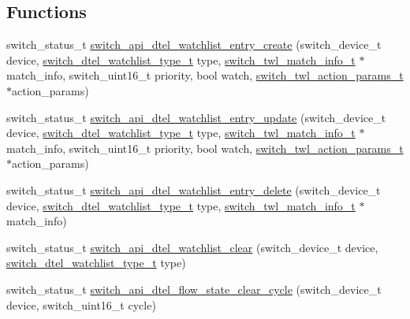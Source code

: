 \subsection*{Functions}
\begin{DoxyCompactItemize}
\item 
switch\+\_\+status\+\_\+t \hyperlink{group__DTel_ga339b280b1b001a48469fba6f5c1e4f6b}{switch\+\_\+api\+\_\+dtel\+\_\+watchlist\+\_\+entry\+\_\+create} (switch\+\_\+device\+\_\+t device, \hyperlink{group__DTel_ga4ab4177e5628351a6074dfbaee9c5857}{switch\+\_\+dtel\+\_\+watchlist\+\_\+type\+\_\+t} type, \hyperlink{group__DTel_gaf669663e566583a08f1b606876efa9e6}{switch\+\_\+twl\+\_\+match\+\_\+info\+\_\+t} $\ast$match\+\_\+info, switch\+\_\+uint16\+\_\+t priority, bool watch, \hyperlink{group__DTel_ga8cce873b25ed2712f3fca9f1c43ca52a}{switch\+\_\+twl\+\_\+action\+\_\+params\+\_\+t} $\ast$action\+\_\+params)
\item 
switch\+\_\+status\+\_\+t \hyperlink{group__DTel_ga94499a29e2afa0b6b0b4ff81b4144d1a}{switch\+\_\+api\+\_\+dtel\+\_\+watchlist\+\_\+entry\+\_\+update} (switch\+\_\+device\+\_\+t device, \hyperlink{group__DTel_ga4ab4177e5628351a6074dfbaee9c5857}{switch\+\_\+dtel\+\_\+watchlist\+\_\+type\+\_\+t} type, \hyperlink{group__DTel_gaf669663e566583a08f1b606876efa9e6}{switch\+\_\+twl\+\_\+match\+\_\+info\+\_\+t} $\ast$match\+\_\+info, switch\+\_\+uint16\+\_\+t priority, bool watch, \hyperlink{group__DTel_ga8cce873b25ed2712f3fca9f1c43ca52a}{switch\+\_\+twl\+\_\+action\+\_\+params\+\_\+t} $\ast$action\+\_\+params)
\item 
switch\+\_\+status\+\_\+t \hyperlink{group__DTel_gadaaf9f7b7f42b1f46fe1f62a61251c0e}{switch\+\_\+api\+\_\+dtel\+\_\+watchlist\+\_\+entry\+\_\+delete} (switch\+\_\+device\+\_\+t device, \hyperlink{group__DTel_ga4ab4177e5628351a6074dfbaee9c5857}{switch\+\_\+dtel\+\_\+watchlist\+\_\+type\+\_\+t} type, \hyperlink{group__DTel_gaf669663e566583a08f1b606876efa9e6}{switch\+\_\+twl\+\_\+match\+\_\+info\+\_\+t} $\ast$match\+\_\+info)
\item 
switch\+\_\+status\+\_\+t \hyperlink{group__DTel_ga99dbea1a71251d19e36e7f3bdee8279b}{switch\+\_\+api\+\_\+dtel\+\_\+watchlist\+\_\+clear} (switch\+\_\+device\+\_\+t device, \hyperlink{group__DTel_ga4ab4177e5628351a6074dfbaee9c5857}{switch\+\_\+dtel\+\_\+watchlist\+\_\+type\+\_\+t} type)
\item 
switch\+\_\+status\+\_\+t \hyperlink{group__DTel_gaf49bb83226a1c6f02ec0d2d24b8803e4}{switch\+\_\+api\+\_\+dtel\+\_\+flow\+\_\+state\+\_\+clear\+\_\+cycle} (switch\+\_\+device\+\_\+t device, switch\+\_\+uint16\+\_\+t cycle)

\end{DoxyCompactItemize}
